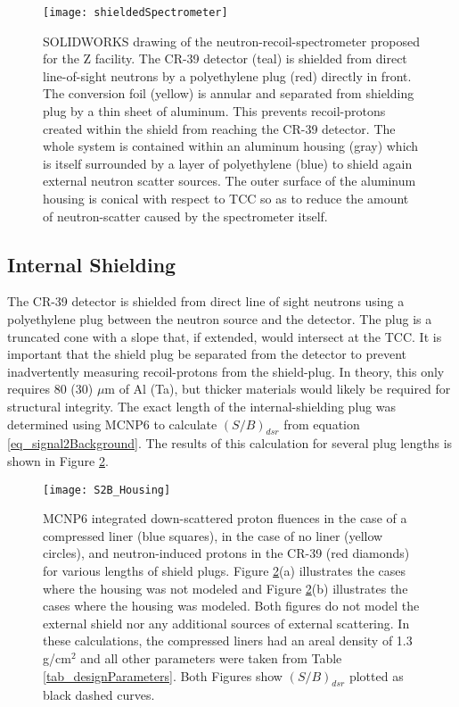 \begin{figure}[h!]
	
	\centering
	\texttt{[image: shieldedSpectrometer]}
	\caption{SOLIDWORKS drawing of the neutron-recoil-spectrometer proposed for the Z facility. The CR-39 detector (teal) is shielded from direct line-of-sight neutrons by a polyethylene plug (red) directly in front. The conversion foil (yellow) is annular and separated from shielding plug by a thin sheet of aluminum. This prevents recoil-protons created within the shield from reaching the CR-39 detector. The whole system is contained within an aluminum housing (gray) which is itself surrounded by a layer of polyethylene (blue) to shield again external neutron scatter sources. The outer surface of the aluminum housing is conical with respect to TCC so as to reduce the amount of neutron-scatter caused by the spectrometer itself. }
	\label{fig_shieldedSpectrometer}
	
\end{figure}

\subsection{Internal Shielding}

The CR-39 detector is shielded from direct line of sight neutrons using a polyethylene plug between the neutron source and the detector. The plug is a truncated cone with a slope that, if extended, would intersect at the TCC. It is important that the shield plug be separated from the detector to prevent inadvertently measuring recoil-protons from the shield-plug. In theory, this only requires 80 (30) $\mu$m of Al (Ta), but thicker materials would likely be required for structural integrity. The exact length of the internal-shielding plug was determined using MCNP6 to calculate $(S/B)_{dsr}$ from equation \ref{eq_signal2Background}. The results of this calculation for several plug lengths is shown in Figure \ref{fig_signal2BackgroundHousing}.

\begin{figure}[h!]
	
	\centering
	\texttt{[image: S2B\_Housing]}
	\caption{MCNP6 integrated down-scattered proton fluences in the case of a compressed liner (blue squares), in the case of no liner (yellow circles), and neutron-induced protons in the CR-39 (red diamonds) for various lengths of shield plugs. Figure \ref{fig_signal2BackgroundHousing}(a) illustrates the cases where the housing was not modeled and Figure \ref{fig_signal2BackgroundHousing}(b) illustrates the cases where the housing was modeled. Both figures do not model the external shield nor any additional sources of external scattering. In these calculations, the compressed liners had an areal density of 1.3 g/cm$^2$ and all other parameters were taken from Table \ref{tab_designParameters}. Both Figures show $(S/B)_{dsr}$ plotted as black dashed curves. }
	\label{fig_signal2BackgroundHousing}
	
\end{figure}

